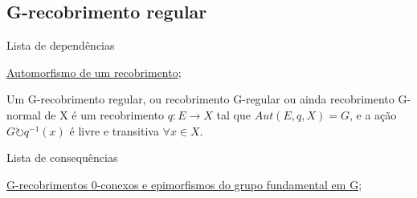 \subsection{G-recobrimento regular}
\label{g-recobrimento-regular-def}
\begin{titlemize}{Lista de dependências}
	\item \hyperref[automorfismo-de-recobrimento-def]{Automorfismo de um recobrimento};
\end{titlemize}
\begin{defi}
	Um G-recobrimento regular, ou recobrimento G-regular ou ainda recobrimento G-normal de X é um recobrimento $q:E \longrightarrow X$ tal que $Aut(E, q, X) = G$, e a ação $G \circlearrowright q^{-1}(x)$ é livre e transitiva $\forall x \in X$.
\end{defi}

\begin{titlemize}{Lista de consequências}
	\item \hyperref[g-recobrimentos-e-epimorfismos-prop]{G-recobrimentos 0-conexos e epimorfismos do grupo fundamental em G};
\end{titlemize}
